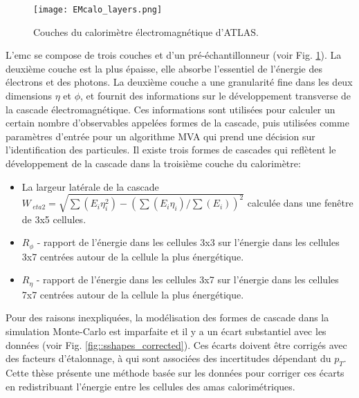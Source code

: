 \begin{figure}[htpb]
	\centering
	\texttt{[image: EMcalo\_layers.png]}
	\caption{ Couches du calorimètre électromagnétique d'ATLAS.}
	\label{fig::calorimeter_layers_s}
\end{figure}

L'\gls{emc} se compose de trois couches et d'un pré-échantillonneur (voir Fig. \ref{fig::calorimeter_layers_s}). La deuxième couche est la plus épaisse, elle absorbe l'essentiel de l'énergie des électrons et des photons. La deuxième couche a une granularité fine dans les deux dimensions $\eta$ et $\phi$, et fournit des informations sur le développement transverse de la cascade électromagnétique. Ces informations sont utilisées pour calculer un certain nombre d'observables appelées formes de la cascade, puis utilisées comme paramètres d'entrée pour un algorithme MVA qui prend une décision sur l'identification des particules. Il existe trois formes de cascades qui reflètent le développement de la cascade dans la troisième couche du calorimètre:

\begin{itemize}
	\item La largeur latérale de la cascade $ W_{\ eta 2} = \sqrt{\sum(E_i \eta^{2}_{i}) - (\sum (E_i \eta_{i}) / \sum(E_i))^2} $ calculée dans une fenêtre de 3x5 cellules.
	\item $ R_{\phi} $ - rapport de l'énergie dans les cellules 3x3 sur l'énergie dans les cellules 3x7 centrées autour de la cellule la plus énergétique.
	\item $ R_{\eta} $ - rapport de l'énergie dans les cellules 3x7 sur l'énergie dans les cellules 7x7 centrées autour de la cellule la plus énergétique.
\end{itemize}

Pour des raisons inexpliquées, la modélisation des formes de cascade dans la simulation Monte-Carlo est imparfaite et il y a un écart substantiel avec les données (voir Fig. \ref{fig::sshapes_corrected}). Ces écarts doivent être corrigés avec des facteurs d'étalonnage, à qui sont associées des incertitudes dépendant du $p_T$. Cette thèse présente une méthode basée sur les données pour corriger ces écarts en redistribuant l'énergie entre les cellules des amas calorimétriques.

\begin{figure*}[ht!]
	\quad
	\quad
	\\
	\caption{ 	\label{fig::sshapes_corrected} \textbf{Left}: $R_{\eta }$ dans $|\eta| = (1.8,2.0)$. \textbf{Central}: $W_{\eta^2 }$ dans $|\eta| = (1.8,2.0)$. \textbf{Right}: $R_{\phi }$ dans $|\eta| = (0.4,0.6)$.  }
\end{figure*}

